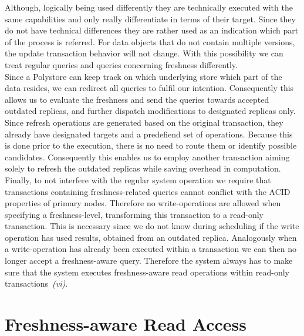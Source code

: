 Although, logically being used differently they are technically executed with the same capabilities and only really differentiate in terms of their target.
Since they do not have technical differences they are rather used as an indication which part of the process is referred.
For data objects that do not contain multiple versions, the update transaction behavior will not change.
With this possibility we can treat regular queries and queries concerning freshness differently.\\
Since a Polystore can keep track on which 
underlying store which part of the data resides, we can redirect all queries to fulfil our intention. Consequently this allows us to evaluate the freshness
and send the queries towards accepted outdated replicas, and further dispatch modifications to designated replicas only.\\
Since refresh operations are generated based on the original transaction, they already have designated targets and a predefiend set of operations.
Because this is done prior to the execution, there is no need to route them or identify possible candidates.
Consequently this enables us to employ another transaction aiming solely to refresh the outdated replicas while saving overhead in computation.\\
Finally, to not interfere with the regular system operation we require that transactions containing freshness-related queries cannot conflict with the ACID properties 
of primary nodes. Therefore no write-operations are allowed when specifying a freshness-level, transforming this transaction to a read-only transaction.
This is necessary since we do not know during scheduling if the write operation has used results, obtained from an outdated replica.
Analogously when a write-operation has already been executed within a transaction we can then no longer accept a freshness-aware query. 
Therefore the system always has to make sure that the system executes freshness-aware read operations within read-only transactions~\textit{(vi)}. 






\section{Freshness-aware Read Access}
\label{sec:read_access}

